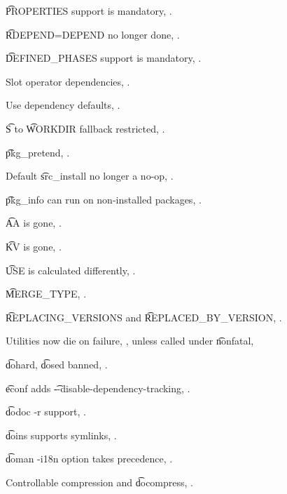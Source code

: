 \begin{compactitem}
\item \t{PROPERTIES} support is mandatory, .
\item \t{RDEPEND=DEPEND} no longer done, .
\item \t{DEFINED\_PHASES} support is mandatory, .
\item Slot operator dependencies, .
\item Use dependency defaults, .
\item \t{S} to \t{WORKDIR} fallback restricted, .
\item \t{pkg\_pretend}, .
\item Default \t{src\_install} no longer a no-op, .
\item \t{pkg\_info} can run on non-installed packages, .
\item \t{AA} is gone, .
\item \t{KV} is gone, .
\item \t{USE} is calculated differently, .
\item \t{MERGE\_TYPE}, .
\item \t{REPLACING\_VERSIONS} and \t{REPLACED\_BY\_VERSION}, .
\item Utilities now die on failure, , unless called under \t{nonfatal},
\item \t{dohard}, \t{dosed} banned, .
\item \t{econf} adds \t{-{}-disable-dependency-tracking}, .
\item \t{dodoc -r} support, .
\item \t{doins} supports symlinks, .
\item \t{doman -i18n} option takes precedence, .
\item Controllable compression and \t{docompress}, .
\end{compactitem}


